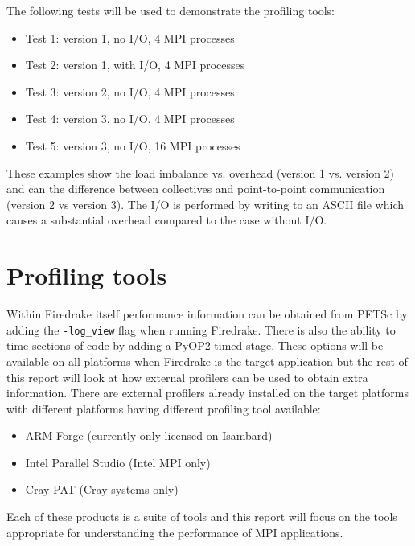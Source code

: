 \documentclass[a4paper,titlepage]{article}
\begin{document}
The following tests will be used to demonstrate the profiling tools:
\begin{itemize}
\item Test 1: version 1, no I/O, 4 MPI processes
\item Test 2: version 1, with I/O, 4 MPI processes
\item Test 3: version 2, no I/O, 4 MPI processes
\item Test 4: version 3, no I/O, 4 MPI processes
\item Test 5: version 3, no I/O, 16 MPI processes 
\end{itemize}
These examples show the load imbalance vs. overhead (version 1 vs. version 2) and can the difference between collectives and point-to-point communication (version 2 vs version 3). The I/O is performed by writing to an ASCII file which causes a substantial overhead compared to the case without I/O.


\section{Profiling tools}
\label{section:profiling_tools}

Within Firedrake itself performance information can be obtained from PETSc by adding the \verb+-log_view+ flag when running Firedrake. There is also the ability to time sections of code by adding a PyOP2 timed stage. These options will be available on all platforms when Firedrake is the target application but the rest of this report will look at how external profilers can be used to obtain extra information. There are external profilers already installed on the target platforms with different platforms having different profiling tool available:
%
\begin{itemize}
\item ARM Forge (currently only licensed on Isambard)
\item Intel Parallel Studio (Intel MPI only)
\item Cray PAT (Cray systems only)
\end{itemize}
%
Each of these products is a suite of tools and this report will focus on the tools appropriate for understanding the performance of MPI applications.

\end{document}
